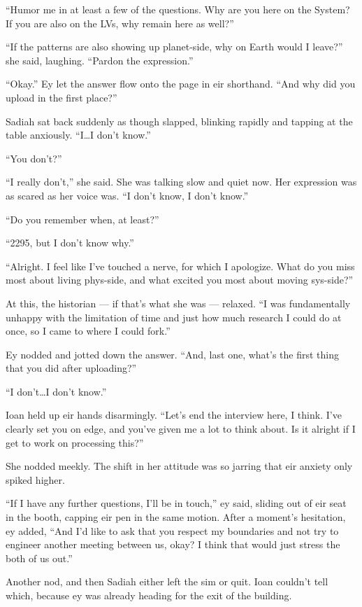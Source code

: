 ``Humor me in at least a few of the questions. Why are you here on the System? If you are also on the LVs, why remain here as well?''

``If the patterns are also showing up planet-side, why on Earth would I leave?'' she said, laughing. ``Pardon the expression.''

``Okay.'' Ey let the answer flow onto the page in eir shorthand. ``And why did you upload in the first place?''

Sadiah sat back suddenly as though slapped, blinking rapidly and tapping at the table anxiously. ``I\ldots I don't know.''

``You don't?''

``I really don't,'' she said. She was talking slow and quiet now. Her expression was as scared as her voice was. ``I don't know, I don't know.''

``Do you remember when, at least?''

``2295, but I don't know why.''

``Alright. I feel like I've touched a nerve, for which I apologize. What do you miss most about living phys-side, and what excited you most about moving sys-side?''

At this, the historian — if that's what she was — relaxed. ``I was fundamentally unhappy with the limitation of time and just how much research I could do at once, so I came to where I could fork.''

Ey nodded and jotted down the answer. ``And, last one, what's the first thing that you did after uploading?''

``I don't\ldots I don't know.''

Ioan held up eir hands disarmingly. ``Let's end the interview here, I think. I've clearly set you on edge, and you've given me a lot to think about. Is it alright if I get to work on processing this?''

She nodded meekly. The shift in her attitude was so jarring that eir anxiety only spiked higher.

``If I have any further questions, I'll be in touch,'' ey said, sliding out of eir seat in the booth, capping eir pen in the same motion. After a moment's hesitation, ey added, ``And I'd like to ask that you respect my boundaries and not try to engineer another meeting between us, okay? I think that would just stress the both of us out.''

Another nod, and then Sadiah either left the sim or quit. Ioan couldn't tell which, because ey was already heading for the exit of the building.

